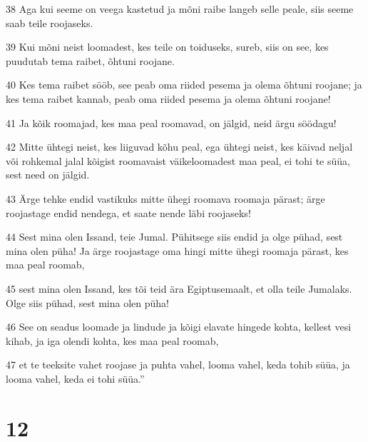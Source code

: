 \par 38 Aga kui seeme on veega kastetud ja mõni raibe langeb selle peale, siis seeme saab teile roojaseks.
\par 39 Kui mõni neist loomadest, kes teile on toiduseks, sureb, siis on see, kes puudutab tema raibet, õhtuni roojane.
\par 40 Kes tema raibet sööb, see peab oma riided pesema ja olema õhtuni roojane; ja kes tema raibet kannab, peab oma riided pesema ja olema õhtuni roojane!
\par 41 Ja kõik roomajad, kes maa peal roomavad, on jälgid, neid ärgu söödagu!
\par 42 Mitte ühtegi neist, kes liiguvad kõhu peal, ega ühtegi neist, kes käivad neljal või rohkemal jalal kõigist roomavaist väikeloomadest maa peal, ei tohi te süüa, sest need on jälgid.
\par 43 Ärge tehke endid vastikuks mitte ühegi roomava roomaja pärast; ärge roojastage endid nendega, et saate nende läbi roojaseks!
\par 44 Sest mina olen Issand, teie Jumal. Pühitsege siis endid ja olge pühad, sest mina olen püha! Ja ärge roojastage oma hingi mitte ühegi roomaja pärast, kes maa peal roomab,
\par 45 sest mina olen Issand, kes tõi teid ära Egiptusemaalt, et olla teile Jumalaks. Olge siis pühad, sest mina olen püha!
\par 46 See on seadus loomade ja lindude ja kõigi elavate hingede kohta, kellest vesi kihab, ja iga olendi kohta, kes maa peal roomab,
\par 47 et te teeksite vahet roojase ja puhta vahel, looma vahel, keda tohib süüa, ja looma vahel, keda ei tohi süüa.”

\chapter{12}


